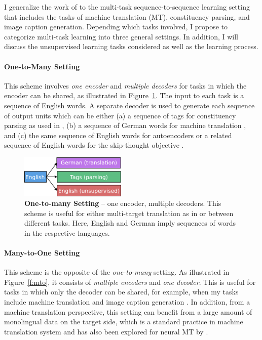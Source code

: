 I generalize the work of \citet{dong15} to the multi-task sequence-to-sequence
learning setting that includes the tasks of machine translation (MT),
constituency parsing, and image caption generation. Depending which tasks 
involved, I propose to categorize multi-task \ssl{} learning into three general
settings.
In addition, I will discuss the unsupervised learning tasks considered as well
as the learning process.

\paragraph{One-to-Many Setting}
This scheme involves {\it one encoder} and {\it multiple decoders} for tasks in
which the encoder can be shared, as illustrated in
Figure~\ref{f:otm}. The input to each task is a sequence of
English words. A separate decoder is used to generate each sequence of
output units which can be either (a) a sequence of tags for
constituency parsing as used in \citep{vinyals15grammar}, (b) a
sequence of German words for machine translation \citep{luong15attn},
and (c) the same sequence of English words for autoencoders or a
related sequence of English words for the skip-thought objective
\citep{kiros15skip}.

\begin{figure}[tbh]
\centering
\includegraphics[width=0.45\textwidth, clip=true, trim= 0 0 0
0]{img/6-1_otm}
\caption[One-to-many Setting]{{\bf One-to-many Setting} -- one encoder, multiple decoders. This scheme
is useful for either multi-target translation as
in \cite{dong15} or between different tasks. Here, English and
German imply sequences of words in the respective languages. 
} 
\label{f:otm}
\end{figure}

\paragraph{Many-to-One Setting}
This scheme is the opposite of the {\it one-to-many}
setting. As illustrated in Figure~\ref{f:mto}, it consists of {\it multiple
encoders} and {\it one decoder}. This is useful for tasks in which only the
decoder can be shared, for example, when my tasks include machine translation
and image caption generation \citep{vinyals15caption}. In addition, from a machine
translation perspective, this setting can benefit from a large
amount of monolingual data on the target side, which is a standard
practice in machine translation system and has also been explored
for neural MT by \cite{gulcehre2015using}.

